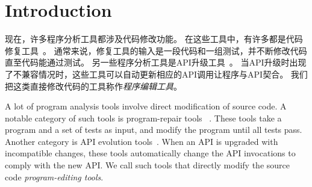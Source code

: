 
\pkuthssffaq

\section{Introduction}
\label{sec:intro}


现在，许多程序分析工具都涉及代码修改功能。
在这些工具中，有许多都是代码修复工具~\parencite{le2012genprog,le2012systematic,QiMLDW14,nguyen2013semfix}。
通常来说，修复工具的输入是一段代码和一组测试，并不断修改代码直至代码能通过测试。
另一些程序分析工具是API升级工具~\parencite{li2015swin,Padioleau06,Meng:2011}。
当API升级时出现了不兼容情况时，这些工具可以自动更新相应的API调用让程序与API契合。
我们把这类直接修改代码的工具称作\emph{程序编辑工具}。

A lot of program analysis tools involve direct modification of
source code. A notable category of such tools is program-repair tools
~\parencite{le2012genprog,le2012systematic,QiMLDW14,nguyen2013semfix}. These tools take a program and a set of tests as
input, and
modify the program until all tests pass. Another
category is API evolution tools~\parencite{li2015swin,Padioleau06,Meng:2011}.
When an API is upgraded with incompatible changes, 
these tools automatically change the API
invocations to comply with the new API. 
We call such tools that directly modify the source code 
\emph{program-editing tools}.

